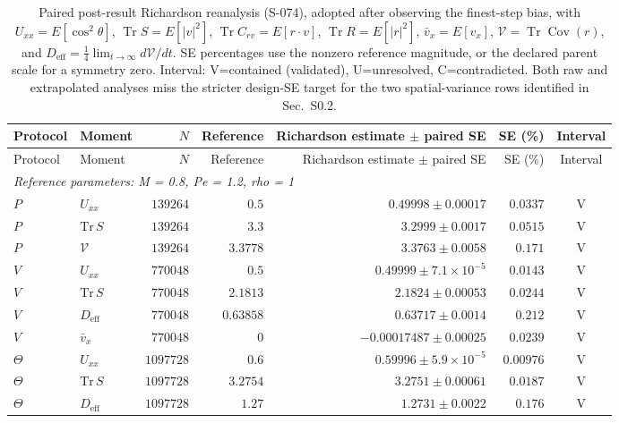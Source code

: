 \begingroup
\small
\setlength{\tabcolsep}{3pt}
\begin{longtable}{llrrrrc}
\caption{Paired post-result Richardson reanalysis (S-074), adopted after observing the finest-step bias, with $U_{xx}=E[\cos^2\theta]$, $\operatorname{Tr}S=E[|v|^2]$, $\operatorname{Tr}C_{rv}=E[r\cdot v]$, $\operatorname{Tr}R=E[|r|^2]$, $\bar v_x=E[v_x]$, $\mathcal V=\operatorname{Tr}\operatorname{Cov}(r)$, and $D_{\mathrm{eff}}=\tfrac14\lim_{t\to\infty}d\mathcal V/dt$. SE percentages use the nonzero reference magnitude, or the declared parent scale for a symmetry zero. Interval: V=contained (validated), U=unresolved, C=contradicted. Both raw and extrapolated analyses miss the stricter design-SE target for the two spatial-variance rows identified in Sec.~S0.2.}\label{tab:s074}\\
\hline
Protocol & Moment & $N$ & Reference & Richardson estimate $\pm$ paired SE & SE (\%) & Interval \\
\hline
\endfirsthead
\hline
Protocol & Moment & $N$ & Reference & Richardson estimate $\pm$ paired SE & SE (\%) & Interval \\
\hline
\endhead
\multicolumn{7}{l}{\textit{Reference parameters: M = 0.8, Pe = 1.2, rho = 1}} \\
$P$ & $U_{xx}$ & $139264$ & $0.5$ & $0.49998 \pm 0.00017$ & $0.0337$ & V \\
$P$ & $\mathrm{Tr}\,S$ & $139264$ & $3.3$ & $3.2999 \pm 0.0017$ & $0.0515$ & V \\
$P$ & $\mathcal V$ & $139264$ & $3.3778$ & $3.3763 \pm 0.0058$ & $0.171$ & V \\
$V$ & $U_{xx}$ & $770048$ & $0.5$ & $0.49999 \pm 7.1\times10^{-5}$ & $0.0143$ & V \\
$V$ & $\mathrm{Tr}\,S$ & $770048$ & $2.1813$ & $2.1824 \pm 0.00053$ & $0.0244$ & V \\
$V$ & $D_{\mathrm{eff}}$ & $770048$ & $0.63858$ & $0.63717 \pm 0.0014$ & $0.212$ & V \\
$V$ & $\bar v_x$ & $770048$ & $0$ & $-0.00017487 \pm 0.00025$ & $0.0239$ & V \\
$\Theta$ & $U_{xx}$ & $1097728$ & $0.6$ & $0.59996 \pm 5.9\times10^{-5}$ & $0.00976$ & V \\
$\Theta$ & $\mathrm{Tr}\,S$ & $1097728$ & $3.2754$ & $3.2751 \pm 0.00061$ & $0.0187$ & V \\
$\Theta$ & $D_{\mathrm{eff}}$ & $1097728$ & $1.27$ & $1.2731 \pm 0.0022$ & $0.176$ & V \\

\end{longtable}
